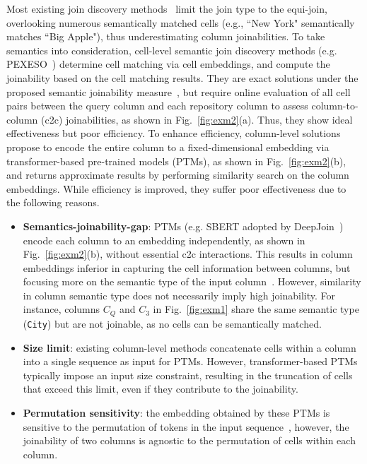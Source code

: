 Most existing join discovery methods~\cite{JOSIE,LSH,DatasetDiscovery,CrossDataDis} limit the join type to the equi-join, overlooking numerous semantically matched cells (e.g., ``New York" semantically matches ``Big Apple"),  thus underestimating column joinabilities. To take semantics into consideration, 
cell-level semantic join discovery methods (e.g. PEXESO~\cite{Pexeso}) determine cell matching via cell embeddings, and compute the joinability based on the cell matching results. 
They are exact solutions under the proposed semantic joinability measure~\cite{Deepjoin,Pexeso}, but require online evaluation of all cell pairs between the query column and each repository column to assess column-to-column (c2c) joinabilities, as shown in Fig.~\ref{fig:exm2}(a).
Thus, they show ideal effectiveness but poor efficiency.
To enhance efficiency,  column-level  solutions~\cite{Deepjoin,WarpGate} propose to encode the entire column to a fixed-dimensional embedding via transformer-based pre-trained models (PTMs), as shown in Fig.~\ref{fig:exm2}(b),
and returns approximate results by performing similarity search on the column embeddings. While efficiency is improved, they suffer poor effectiveness due to the following reasons.
\begin{itemize}  
\item{} \textbf{Semantics-joinability-gap}: PTMs (e.g. SBERT adopted by DeepJoin~\cite{Deepjoin}) encode each column to an embedding independently, as shown in Fig.~\ref{fig:exm2}(b), without essential c2c interactions. This results in column embeddings inferior in capturing the cell information between columns, but focusing more on the semantic type of the input column~\cite{Watchog}. However, similarity in column semantic type does not necessarily imply high joinability. For instance, columns $C_Q$ and $C_3$ in Fig.~\ref{fig:exm1} share the same semantic type (\texttt{City}) but are not joinable, as no cells can be semantically matched.
\item{} \textbf{Size limit}: existing column-level methods concatenate cells within a column into a single sequence as input for PTMs. However, transformer-based PTMs typically impose an input size constraint, resulting in the truncation  of cells that exceed this limit, even if they contribute to the joinability. 
\item{} \textbf{Permutation sensitivity}: the embedding  obtained by these PTMs is sensitive to the permutation of tokens in the input sequence~\cite{tableembed}, however, the joinability of two columns is agnostic to the permutation of cells within each column.
\end{itemize}
